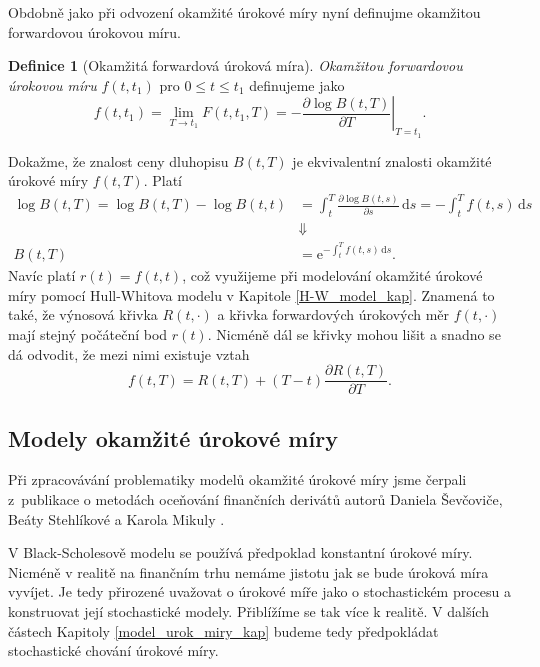 \documentclass[a4paper,12pt]{report}
\theoremstyle{definition} \newtheorem{definice}[veta]{Definice}
\theoremstyle{remark}
\begin{document}
Obdobně jako při odvození okamžité úrokové míry nyní definujme okamžitou forwardovou úrokovou míru. 
\begin{definice}[Okamžitá forwardová úroková míra]
\textit{Okamžitou forwardovou úrokovou míru} $f(t,t_1)$ pro $0\leq t\leq t_1$ definujeme jako
\begin{equation}\label{okamzik_forward_rov}
f(t,t_1)=\lim_{T\to t_1}F(t,t_1,T)=\left.-\frac{\partial\log B(t,T)}{\partial T}\right|_{T=t_1}.%
\end{equation} 
\end{definice}
Dokažme, že znalost ceny dluhopisu $B(t,T)$ je ekvivalentní znalosti okamžité úrokové míry $f(t,T)$.
Platí
\begin{align*}
\log B(t,T)=\log B(t,T)-\log B(t,t)
&=\int_{t}^T \frac{\partial\log B(t,s)}{\partial s}\,\mathrm{d}s=-\int_{t}^Tf(t,s)\,\mathrm{d}s\\
&\Downarrow\\
B(t,T)&=\mathrm{e}^{-\int_{t}^T f(t,s)\,\mathrm{d}s}.
\end{align*}
Navíc platí $r(t)=f(t,t)$, což využijeme při modelování okamžité úrokové míry pomocí Hull-Whitova modelu v Kapitole \ref{H-W_model_kap}.
Znamená to také, že výnosová křivka $R(t,\cdot)$ a křivka forwardových úrokových měr $f(t,\cdot)$ mají stejný počáteční bod $r(t)$.
Nicméně dál se křivky mohou lišit a snadno se dá odvodit, že mezi nimi existuje vztah
\begin{equation}
f(t,T)=R(t,T)+(T-t)\frac{\partial R(t,T)}{\partial T}.
\end{equation} 

\subsection{Modely okamžité úrokové míry}
Při zpracovávání problematiky modelů okamžité úrokové míry jsme čerpali z~publikace o metodách oceňování finančních derivátů autorů Daniela Ševčoviče, Beáty Stehlíkové a Karola Mikuly \cite{sevcovic2009}. 

V Black-Scholesově modelu se používá předpoklad konstantní úrokové míry.
Nicméně v realitě na finančním trhu nemáme jistotu jak se bude úroková míra vyvíjet.
Je tedy přirozené uvažovat o úrokové míře jako o stochastickém procesu a konstruovat její stochastické modely.
Přiblížíme se tak více k realitě.
V dalších částech Kapitoly \ref{model_urok_miry_kap} budeme tedy předpokládat stochastické chování úrokové míry.
\end{document}
